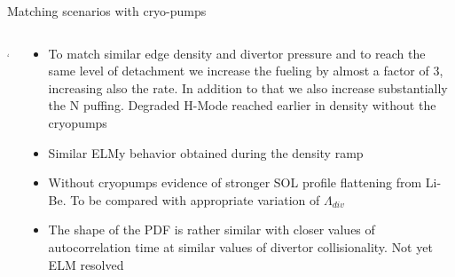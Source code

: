 \documentclass[10pt, compress]{beamer}
\newcommand\Fontvi{\fontsize{8}{7.2}\selectfont}
\begin{document}
\begin{frame}{Matching scenarios with cryo-pumps}
\Fontvi
  \vspace{-1cm}
\begin{columns}
  \begin{column}{0.65\textwidth}
    4
  \end{column}
  \begin{column}{0.35\textwidth}
    \begin{itemize}
      \item<1-> To match similar edge density and divertor pressure
        and to reach the same level of detachment we increase the
        fueling by almost a factor of 3, increasing also the rate. In
        addition to that we also increase substantially the N
        puffing. \alert{Degraded H-Mode reached earlier in density
          without the cryopumps}
      \item<2-> Similar ELMy behavior obtained during the density ramp  
      \item<3-> Without cryopumps evidence of stronger SOL profile
        flattening from Li-Be. \alert{To be compared with appropriate
          variation of $\Lambda_{div}$}
       \item<4> The shape of the PDF is rather similar with closer
         values of autocorrelation time at similar values of divertor
         collisionality. \alert{Not yet ELM resolved}
    \end{itemize}
  \end{column}
\end{columns}
\end{frame}
\end{document}
